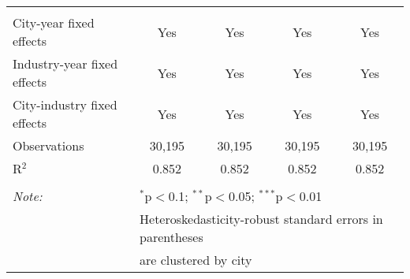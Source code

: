 \documentclass[12pt]{article}
\begin{document}
\begin{table}[!htbp]
\begin{adjustbox}{width=\textwidth, totalheight=\baselineskip,keepaspectratio}
\begin{tabular}{@{\extracolsep{5pt}}lcccc}
      \hline \\[-1.8ex]
      City-year fixed effects                                                                 & Yes      & Yes             & Yes             & Yes             \\
      Industry-year fixed effects                                                             & Yes      & Yes             & Yes             & Yes             \\
      City-industry fixed effects                                                             & Yes      & Yes             & Yes             & Yes             \\
      Observations                                                                            & 30,195   & 30,195          & 30,195          & 30,195          \\
      R$^{2}$                                                                                 & 0.852    & 0.852           & 0.852           & 0.852           \\
      \hline
      \hline \\[-1.8ex]
      \textit{Note:}  & \multicolumn{4}{l}{$^{*}$p$<$0.1; $^{**}$p$<$0.05; $^{***}$p$<$0.01} \\
      & \multicolumn{4}{l}{Heteroskedasticity-robust standard errors in parentheses} \\
      & \multicolumn{4}{l}{are clustered by city} \\
    \end{tabular}
  \end{adjustbox}
\end{table}
\end{document}

